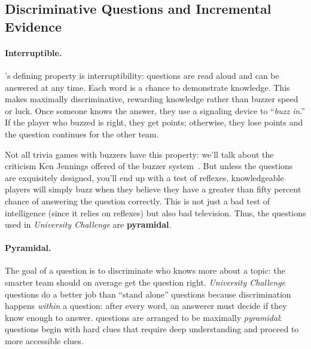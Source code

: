 \subsection{Discriminative Questions and Incremental Evidence}
\label{sec:manchester:qb-discriminative}

\paragraph{Interruptible.}
%
\quizbowl{}'s defining property is interruptibility: questions are read aloud and
can be answered at any time. Each word is a chance to demonstrate knowledge.
This makes \quizbowl{} maximally discriminative, rewarding knowledge rather than
buzzer speed or luck.
%
Once someone knows the answer, they use a
signaling device to ``\emph{buzz in}.'' If the player who buzzed is right, they
get points; otherwise, they lose points and the question continues for the
other team.

Not all trivia games with buzzers have this property: we'll talk about
the criticism Ken Jennings offered of the \jeopardy{} buzzer
system~\cite[he first earned his buzzer callouses playing \quizbowl{}
at Brigham Young University in Provo, Utah]{jennings-06}.
%
But unless the questions are exquisitely designed, you'll end up with
a test of reflexes, knowledgeable players will simply buzz when they
believe they have a greater than fifty percent chance of answering the
question correctly.
%
This is not just a bad test of intelligence (since it relies on
reflexes) but also bad television.
%
Thus, the questions used in \textit{University Challenge} are \textbf{pyramidal}.

\paragraph{Pyramidal.}
\label{sec:manchester:pyramidality}
%
The goal of a question is to discriminate who knows more about a
topic: the smarter team should on average get the question right.
%
\textit{University Challenge} questions do a better job than ``stand alone'' questions
because discrimination happens \emph{within} a question: after every
word, an answerer must decide if they know enough to answer. \qb{}
questions are arranged to be maximally \emph{pyramidal}: questions
begin with hard clues that require deep understanding and proceed to
more accessible clues.


